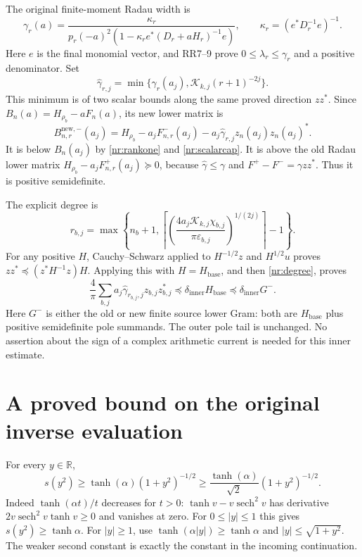 \documentclass[11pt]{article}
\newcommand{\R}{\mathbb R}
\begin{document}
The original finite-moment Radau width is
\[
 \gamma_r(a)=\frac{\kappa_r}
 {p_r(-a)^2(1-\kappa_re^*(D_r+aH_r)^{-1}e)},\qquad
 \kappa_r=(e^*D_r^{-1}e)^{-1}.
\]
Here $e$ is the final monomial vector, and RR7--9 prove
$0\le\lambda_r\le\gamma_r$ and a positive denominator.
Set
\begin{equation}\tag{NR18}\label{nr:scalarcap}
 \widehat\gamma_{r,j}
 =\min\{\gamma_r(a_j),\mathcal K_{k,j}(r+1)^{-2j}\}.
\end{equation}
This minimum is of two scalar bounds along the same proved direction
$zz^*$. Since $B_n(a)=H_{\rho_b}-aF_n(a)$, its new lower matrix is
\[
 B^{\mathrm{new},-}_{n,r}(a_j)
 =H_{\rho_b}-a_jF^-_{n,r}(a_j)
       -a_j\widehat\gamma_{r,j}z_n(a_j)z_n(a_j)^*.
\]
It is below $B_n(a_j)$ by \eqref{nr:rankone} and
\eqref{nr:scalarcap}. It is above the old Radau lower matrix
$H_{\rho_b}-a_jF^+_{n,r}(a_j)\succeq0$, because
$\widehat\gamma\le\gamma$ and $F^+-F^-=\gamma zz^*$.
Thus it is positive semidefinite.

The explicit degree is
\begin{equation}\tag{NR19}\label{nr:degree}
 r_{b,j}=\max\left\{n_b+1,
 \left\lceil\left(
 \frac{4a_j\mathcal K_{k,j}\chi_{b,j}}
 {\pi\varepsilon_{b,j}}\right)^{1/(2j)}\right\rceil-1\right\}.
\end{equation}
For any positive $H$, Cauchy--Schwarz applied to
$H^{-1/2}z$ and $H^{1/2}u$ proves
$zz^*\preceq(z^*H^{-1}z)H$. Applying this with
$H=H_{\mathrm{base}}$, and then \eqref{nr:degree}, proves
\begin{equation}\tag{NR20}\label{nr:inner}
 \frac4\pi\sum_{b,j}a_j\widehat\gamma_{r_{b,j},j}
 z_{b,j}z_{b,j}^*
 \preceq\delta_{\mathrm{inner}}H_{\mathrm{base}}
 \preceq\delta_{\mathrm{inner}}G^-.
\end{equation}
Here $G^-$ is either the old or new finite source lower Gram: both
are $H_{\mathrm{base}}$ plus positive semidefinite pole summands.
The outer pole tail is unchanged. No assertion about the sign of a
complex arithmetic current is needed for this inner estimate.

\section{A proved bound on the original inverse evaluation}

For every $y\in\R$,
\begin{equation}\tag{NR21}\label{nr:slow}
 s(y^2)\ge\tanh(\alpha)(1+y^2)^{-1/2}
 \ge\frac{\tanh(\alpha)}{\sqrt2}(1+y^2)^{-1/2}.
\end{equation}
Indeed $\tanh(\alpha t)/t$ decreases for $t>0$:
$\tanh v-v\operatorname{sech}^2v$ has derivative
$2v\operatorname{sech}^2v\tanh v\ge0$ and vanishes at zero.
For $0\le|y|\le1$ this gives $s(y^2)\ge\tanh\alpha$.
For $|y|\ge1$, use $\tanh(\alpha|y|)\ge\tanh\alpha$ and
$|y|\le\sqrt{1+y^2}$. The weaker second constant is exactly the
constant in the incoming continuation.
\end{document}
